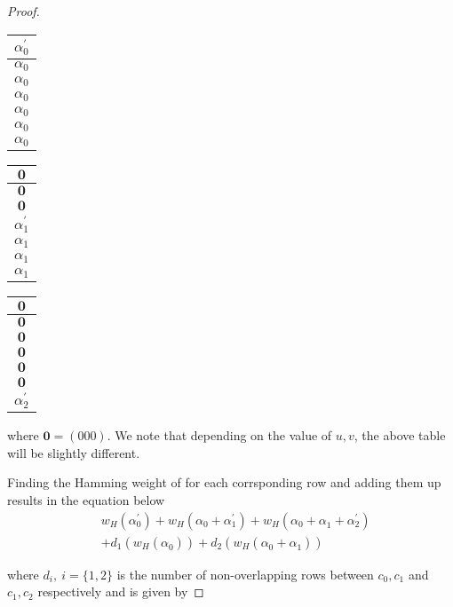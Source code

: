\documentclass[fontsize=12pt]{article}
\theoremstyle{definition}
\begin{document}
\begin{proof}
\begin{center}
\begin{tabular}{| c |}
\hline
$\alpha_0^{'}$ \\
\hline
$\alpha_0$ \\
\hline
$\alpha_0$ \\
\hline
$\alpha_0$ \\
\hline
 $\alpha_0$ \\
\hline
 $\alpha_0$ \\
\hline
$\alpha_0$ \\
\hline
\end{tabular}
\quad
\begin{tabular}{| c |}
\hline
$\mathbf{0}$  \\
\hline
$\mathbf{0}$ \\
\hline
 $\mathbf{0}$ \\
\hline
 $\alpha_1^{'}$ \\
\hline
$\alpha_1$ \\
\hline
$\alpha_1$  \\
\hline
$\alpha_1$  \\
\hline
\end{tabular}
\quad
\begin{tabular}{| c |}
\hline
$\mathbf{0}$  \\
\hline
$\mathbf{0}$ \\
\hline
 $\mathbf{0}$ \\
\hline
$\mathbf{0}$ \\
\hline
$\mathbf{0}$ \\
\hline
$\mathbf{0}$ \\
\hline
$\alpha_2^{'}$  \\
\hline
\end{tabular}
\end{center}

where $\mathbf{0}=(0 0 0)$. We note that depending on the value of $u,v$, the above table will be slightly different.

Finding the Hamming weight of for each corrsponding row and adding them up results in the equation below 
\begin{equation}
\begin{aligned}
&w_H(\alpha^{'}_0)  +w_H(\alpha_0+\alpha^{'}_1)+w_H(\alpha_0+\alpha^{}_1
+\alpha^{'}_2)\\
&+d_1\left(w_H(\alpha^{}_0)\right)+d_2\left(w_H(\alpha^{}_0 + \alpha^{}_1)\right)
\end{aligned}
\end{equation}

where $d_i,~i=\{1,2\}$ is the number of non-overlapping rows between $c_0,c_1$ and $c_1,c_2$ respectively and is given by


\end{proof}
\end{document}

